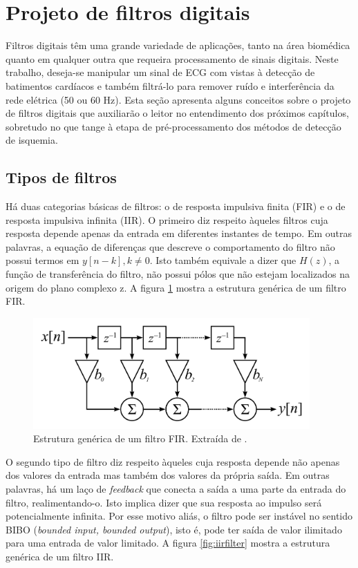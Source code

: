 \section{Projeto de filtros digitais}
\label{sec:filterdesign}
Filtros digitais têm uma grande variedade de aplicações, tanto na área biomédica quanto em qualquer outra que requeira processamento de sinais digitais. Neste trabalho, deseja-se manipular um sinal de ECG com vistas à detecção de batimentos cardíacos e também filtrá-lo para remover ruído e interferência da rede elétrica (50 ou 60 Hz). Esta seção apresenta alguns conceitos sobre o projeto de filtros digitais que auxiliarão o leitor no entendimento dos próximos capítulos, sobretudo no que tange à etapa de pré-processamento dos métodos de detecção de isquemia.

\subsection*{Tipos de filtros}
Há duas categorias básicas de filtros: o de resposta impulsiva finita (FIR) e o de resposta impulsiva infinita (IIR). O primeiro diz respeito àqueles filtros cuja resposta depende apenas da entrada em diferentes instantes de tempo. Em outras palavras, a equação de diferenças que descreve o comportamento do filtro não possui termos em $y[n-k], k\neq 0$. Isto também equivale a dizer que $H(z)$, a função de transferência do filtro, não possui pólos que não estejam localizados na origem do plano complexo z. A figura \ref{fig:firfilter} mostra a estrutura genérica de um filtro FIR.

\begin{figure}[ht!]
    \centering
    \includegraphics[width=300pt]{figures/chap3-fir-filter.pdf}
    \caption[Estrutura genérica de um filtro FIR]{Estrutura genérica de um filtro FIR. Extraída de \cite{Blanchard2008}.}
    \label{fig:firfilter}
\end{figure}

O segundo tipo de filtro diz respeito àqueles cuja resposta depende não apenas dos valores da entrada mas também dos valores da própria saída. Em outras palavras, há um laço de \emph{feedback} que conecta a saída a uma parte da entrada do filtro, realimentando-o. Isto implica dizer que sua resposta ao impulso será potencialmente infinita. Por esse motivo aliás, o filtro pode ser instável no sentido BIBO (\emph{bounded input, bounded output}), isto é, pode ter saída de valor ilimitado para uma entrada de valor limitado. A figura \ref{fig:iirfilter} mostra a estrutura genérica de um filtro IIR.

